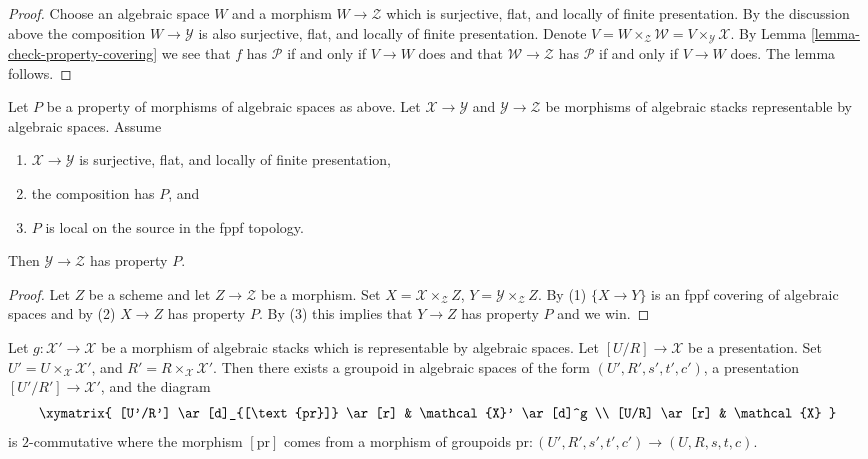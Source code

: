 \begin{proof}
Choose an algebraic space $W$ and a morphism
$W \to \mathcal{Z}$ which is surjective, flat, and locally of finite
presentation. By the discussion above the composition
$W \to \mathcal{Y}$ is also surjective, flat, and locally of finite
presentation. Denote
$V = W \times_\mathcal{Z} \mathcal{W} = V \times_\mathcal{Y} \mathcal{X}$.
By
Lemma \ref{lemma-check-property-covering}
we see that $f$ has $\mathcal{P}$ if and only if $V \to W$ does
and that $\mathcal{W} \to \mathcal{Z}$ has $\mathcal{P}$ if and only
if $V \to W$ does. The lemma follows.
\end{proof}

\begin{lemma}
\label{lemma-check-property-after-precomposing}
Let $P$ be a property of morphisms of algebraic spaces as above.
Let $\mathcal{X} \to \mathcal{Y}$ and $\mathcal{Y} \to \mathcal{Z}$
be morphisms of algebraic stacks representable by algebraic spaces.
Assume
\begin{enumerate}
\item $\mathcal{X} \to \mathcal{Y}$ is surjective, flat, and locally
of finite presentation,
\item the composition has $P$, and
\item $P$ is local on the source in the fppf topology.
\end{enumerate}
Then $\mathcal{Y} \to \mathcal{Z}$ has property $P$.
\end{lemma}

\begin{proof}
Let $Z$ be a scheme and let $Z \to \mathcal{Z}$ be a morphism.
Set $X = \mathcal{X} \times_\mathcal{Z} Z$,
$Y = \mathcal{Y} \times_\mathcal{Z} Z$. By (1) $\{X \to Y\}$
is an fppf covering of algebraic spaces and by (2) $X \to Z$ has property
$P$. By (3) this implies that $Y \to Z$ has property $P$
and we win.
\end{proof}

\begin{lemma}
\label{lemma-representable-in-terms-presentations}
Let $g : \mathcal{X}' \to \mathcal{X}$ be a morphism of algebraic stacks
which is representable by algebraic spaces. Let $[U/R] \to \mathcal{X}$
be a presentation. Set $U' = U \times_\mathcal{X} \mathcal{X}'$,
and $R' = R \times_\mathcal{X} \mathcal{X}'$.
Then there exists a groupoid in algebraic spaces of the form
$(U', R', s', t', c')$, a presentation $[U'/R'] \to \mathcal{X}'$,
and the diagram
$$
\xymatrix{
[U'/R'] \ar[d]_{[\text{pr}]} \ar[r] & \mathcal{X}' \ar[d]^g \\
[U/R] \ar[r] & \mathcal{X}
}
$$
is $2$-commutative where the morphism $[\text{pr}]$ comes from a
morphism of groupoids
$\text{pr} : (U', R', s', t', c') \to (U, R, s, t, c)$.
\end{lemma}

